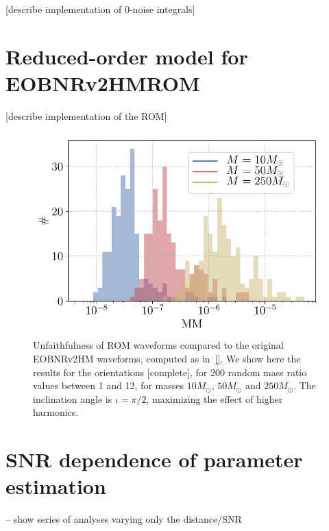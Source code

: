 \documentclass[aps,showpacs,twocolumn,prd,superscriptaddress,nofootinbib]{revtex4-1}
\newcommand{\Msol}{M_{\odot}}
\newcommand{\SM}[1]{{\color{Blue} #1}}
\begin{document}
[describe implementation of 0-noise integrals]


\section{Reduced-order model for EOBNRv2HMROM}
\label{sec:rom}

[describe implementation of the ROM]

\begin{figure}
  \centering
  \includegraphics[width=.99\linewidth]{../plots/plot_MM_ROM.pdf}
  \caption{Unfaithfulness of ROM waveforms compared to the original EOBNRv2HM waveforms, computed as in~\eqref{}. We show here the results for the orientations \SM{[complete]}, for 200 random mass ratio values between 1 and 12, for masses $10 \Msol$, $50 \Msol$ and $250 \Msol$. The inclination angle is $\iota = \pi/2$, maximizing the effect of higher harmonics.}
  \label{fig:MMROM}
\end{figure}


\section{SNR dependence of parameter estimation}
\label{sec:SMBHPEdistance}

-- show series of analyses varying only the distance/SNR
\end{document}
